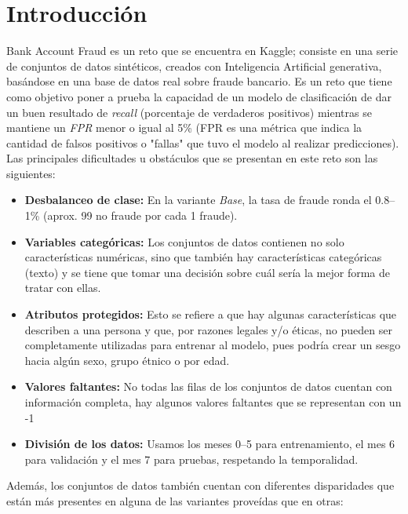 \documentclass[runningheads]{llncs}
\begin{document}
\section{Introducción}
Bank Account Fraud es un reto que se encuentra en Kaggle; consiste en una serie de conjuntos de datos sintéticos, creados con Inteligencia Artificial generativa, basándose en una base de datos real sobre fraude bancario. Es un reto que tiene como objetivo poner a prueba la capacidad de un modelo de clasificación de dar un buen resultado de \textit{recall} (porcentaje de verdaderos positivos) mientras se mantiene un \textit{FPR} menor o igual al 5\% (FPR es una métrica que indica la cantidad de falsos positivos o "fallas" que tuvo el modelo al realizar predicciones). Las principales dificultades u obstáculos que se presentan en este reto son las siguientes:
\begin{itemize}
    \item \textbf{Desbalanceo de clase:} En la variante \textit{Base}, la tasa de fraude ronda el 0.8–1\% (aprox. 99 no fraude por cada 1 fraude).
    \item \textbf{Variables categóricas:} Los conjuntos de datos contienen no solo características numéricas, sino que también hay características categóricas (texto) y se tiene que tomar una decisión sobre cuál sería la mejor forma de tratar con ellas.
    \item \textbf{Atributos protegidos:} Esto se refiere a que hay algunas características que describen a una persona y que, por razones legales y/o éticas, no pueden ser completamente utilizadas para entrenar al modelo, pues podría crear un sesgo hacia algún sexo, grupo étnico o por edad.
    \item \textbf{Valores faltantes:} No todas las filas de los conjuntos de datos cuentan con información completa, hay algunos valores faltantes que se representan con un -1
    \item \textbf{División de los datos:} Usamos los meses 0–5 para entrenamiento, el mes 6 para validación y el mes 7 para pruebas, respetando la temporalidad.
\end{itemize}
Además, los conjuntos de datos también cuentan con diferentes disparidades que están más presentes en alguna de las variantes proveídas que en otras:
\end{document}
